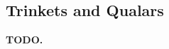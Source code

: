 \subsection*{Trinkets and Qualars} \label{ssec::trinketsandqualars}
\textbf{TODO.}
\newpage~\newpage
